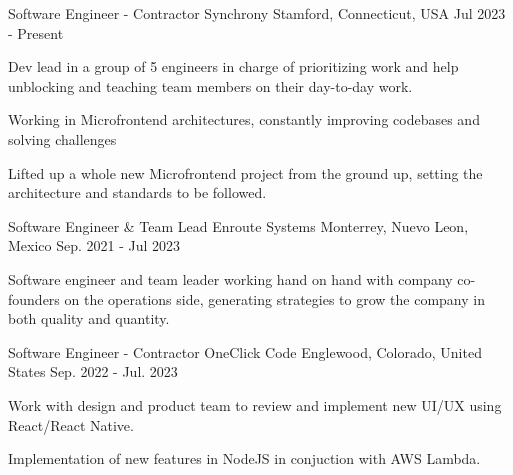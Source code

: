 

\begin{cventries}

  \cventry
    {Software Engineer - Contractor} %
    {Synchrony} %
    {Stamford, Connecticut, USA} %
    {Jul 2023 - Present} %
    {
      \begin{cvitems} %
        \item {Dev lead in a group of 5 engineers in charge of prioritizing work and help unblocking and teaching team members on their day-to-day work.}
        \item {Working in Microfrontend architectures, constantly improving codebases and solving challenges}
        \item {Lifted up a whole new Microfrontend project from the ground up, setting the architecture and standards to be followed.}
      \end{cvitems}
    }

  \cventry
    {Software Engineer \& Team Lead} %
    {Enroute Systems} %
    {Monterrey, Nuevo Leon, Mexico} %
    {Sep. 2021 - Jul 2023} %
    {
      \begin{cvitems} %
        \item {Software engineer and team leader working hand on hand with company co-founders on the operations side, generating
strategies to grow the company in both quality and quantity.}
      \end{cvitems}
    }

  \cventry
    {Software Engineer - Contractor} %
    {OneClick Code} %
    {Englewood, Colorado, United States} %
    {Sep. 2022 - Jul. 2023} %
    {
      \begin{cvitems} %
        \item {Work with design and product team to review and implement new UI/UX using React/React Native.}
        \item {Implementation of new features in NodeJS in conjuction with AWS Lambda.}
      \end{cvitems}
    }


\end{cventries}
